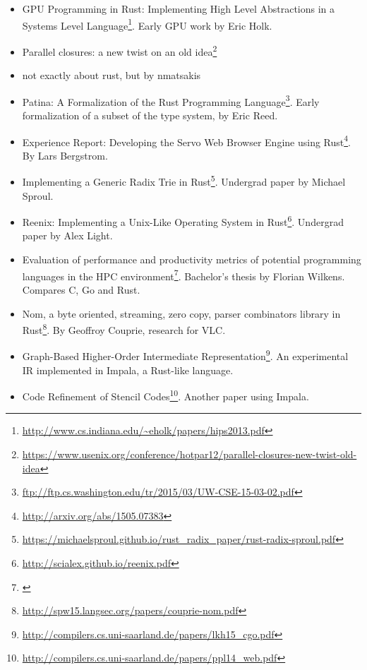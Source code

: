 \documentclass[a4paper,]{book}
\renewcommand{\href}[2]{#2\footnote{\url{#1}}}
\providecommand{\tightlist}{%
  \setlength{\itemsep}{0pt}\setlength{\parskip}{0pt}}
\begin{document}
\begin{itemize}
\tightlist
\item
  \href{http://www.cs.indiana.edu/~eholk/papers/hips2013.pdf}{GPU
  Programming in Rust: Implementing High Level Abstractions in a Systems
  Level Language}. Early GPU work by Eric Holk.
\item
  \href{https://www.usenix.org/conference/hotpar12/parallel-closures-new-twist-old-idea}{Parallel
  closures: a new twist on an old idea}
\item
  not exactly about rust, but by nmatsakis
\item
  \href{ftp://ftp.cs.washington.edu/tr/2015/03/UW-CSE-15-03-02.pdf}{Patina:
  A Formalization of the Rust Programming Language}. Early formalization
  of a subset of the type system, by Eric Reed.
\item
  \href{http://arxiv.org/abs/1505.07383}{Experience Report: Developing
  the Servo Web Browser Engine using Rust}. By Lars Bergstrom.
\item
  \href{https://michaelsproul.github.io/rust_radix_paper/rust-radix-sproul.pdf}{Implementing
  a Generic Radix Trie in Rust}. Undergrad paper by Michael Sproul.
\item
  \href{http://scialex.github.io/reenix.pdf}{Reenix: Implementing a
  Unix-Like Operating System in Rust}. Undergrad paper by Alex Light.
\item
  \href{}{Evaluation of performance and productivity metrics of
  potential programming languages in the HPC environment}. Bachelor's
  thesis by Florian Wilkens. Compares C, Go and Rust.
\item
  \href{http://spw15.langsec.org/papers/couprie-nom.pdf}{Nom, a byte
  oriented, streaming, zero copy, parser combinators library in Rust}.
  By Geoffroy Couprie, research for VLC.
\item
  \href{http://compilers.cs.uni-saarland.de/papers/lkh15_cgo.pdf}{Graph-Based
  Higher-Order Intermediate Representation}. An experimental IR
  implemented in Impala, a Rust-like language.
\item
  \href{http://compilers.cs.uni-saarland.de/papers/ppl14_web.pdf}{Code
  Refinement of Stencil Codes}. Another paper using Impala.
\end{itemize}
\end{document}
